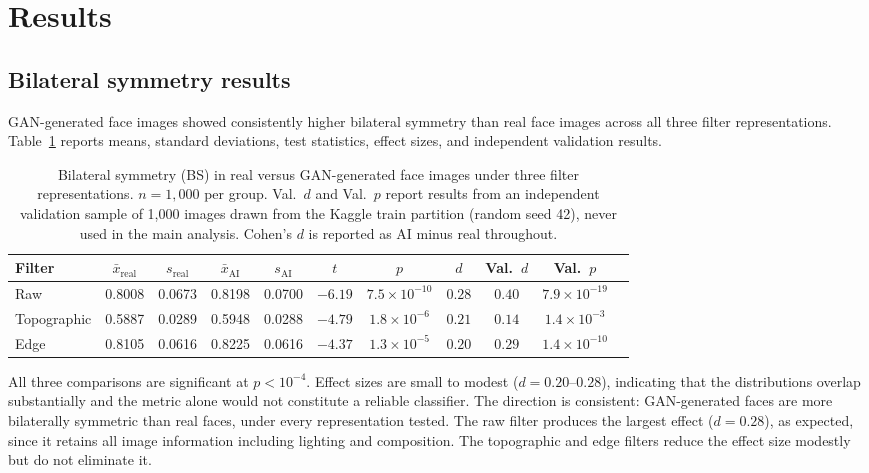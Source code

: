 \documentclass[11pt,a4paper]{article}
\begin{document}
\section{Results}

\subsection{Bilateral symmetry results}

GAN-generated face images showed consistently higher bilateral symmetry than
real face images across all three filter representations. Table~\ref{tab:main}
reports means, standard deviations, test statistics, effect sizes, and
independent validation results.

\begin{table}[H]
\centering
\caption{Bilateral symmetry (BS) in real versus GAN-generated face images under
three filter representations. $n = 1{,}000$ per group. Val.\ $d$ and Val.\ $p$
report results from an independent validation sample of 1,000 images drawn from
the Kaggle train partition (random seed 42), never used in the main analysis.
Cohen's $d$ is reported as AI minus real throughout.}
\label{tab:main}
\small
\begin{tabular}{lcccccccccc}
\toprule
Filter & $\bar{x}_\text{real}$ & $s_\text{real}$ & $\bar{x}_\text{AI}$ &
$s_\text{AI}$ & $t$ & $p$ & $d$ & Val.\ $d$ & Val.\ $p$ \\
\midrule
Raw         & 0.8008 & 0.0673 & 0.8198 & 0.0700 & $-6.19$ &
  $7.5\times10^{-10}$ & $0.28$ & $0.40$ & $7.9\times10^{-19}$ \\
Topographic & 0.5887 & 0.0289 & 0.5948 & 0.0288 & $-4.79$ &
  $1.8\times10^{-6}$  & $0.21$ & $0.14$ & $1.4\times10^{-3}$  \\
Edge        & 0.8105 & 0.0616 & 0.8225 & 0.0616 & $-4.37$ &
  $1.3\times10^{-5}$  & $0.20$ & $0.29$ & $1.4\times10^{-10}$ \\
\bottomrule
\end{tabular}
\end{table}

All three comparisons are significant at $p < 10^{-4}$. Effect sizes are small
to modest ($d = 0.20$--$0.28$), indicating that the distributions overlap
substantially and the metric alone would not constitute a reliable classifier.
The direction is consistent: GAN-generated faces are more bilaterally symmetric
than real faces, under every representation tested. The raw filter produces the
largest effect ($d = 0.28$), as expected, since it retains all image information
including lighting and composition. The topographic and edge filters reduce the
effect size modestly but do not eliminate it.
\end{document}
